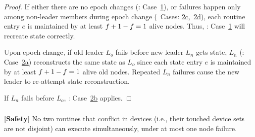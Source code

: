 \begin{proof}
\label{comesh:lemma:inheritance:extension:proof}
If either there are no epoch changes (: Case~\hyperref[comesh:lemma:inheritance:case1]{1}),  
or failures happen only among non-leader members during  epoch change
(~Cases: \hyperref[comesh:lemma:inheritance:case2c]{2c},~\hyperref[comesh:lemma:inheritance:case2d]{2d}),
each routine entry $e$ is maintained by at least $f + 1 - f = 1$ alive nodes.
Thus, : Case~\hyperref[comesh:lemma:inheritance:case1]{1} will recreate state correctly.

Upon epoch change, if old leader $L_o$ fails before  new leader $L_n$ gets  state,
$L_n$ (: Case~\hyperref[comesh:lemma:inheritance:case2a]{2a})  reconstructs the same state as $L_o$
since each state entry $e$ is maintained by at least $f + 1 - f = 1$ alive old \kgroup{} nodes. 
Repeated $L_n$ failures cause the new leader to re-attempt state reconstruction. 
 
If $L_n$ fails before $L_o$,  : Case~\hyperref[comesh:lemma:inheritance:case2b]{2b} applies.
\end{proof}

\subsubsection{\Safety{}}
\label{comesh:subsec:safety}

\begin{theorem}
\label{comesh:theorem:safety} {\bf [Safety]} 
No two routines that conflict in devices (i.e., their touched device sets are not disjoint) can execute simultaneously, under at most one node failure. 
\end{theorem}

